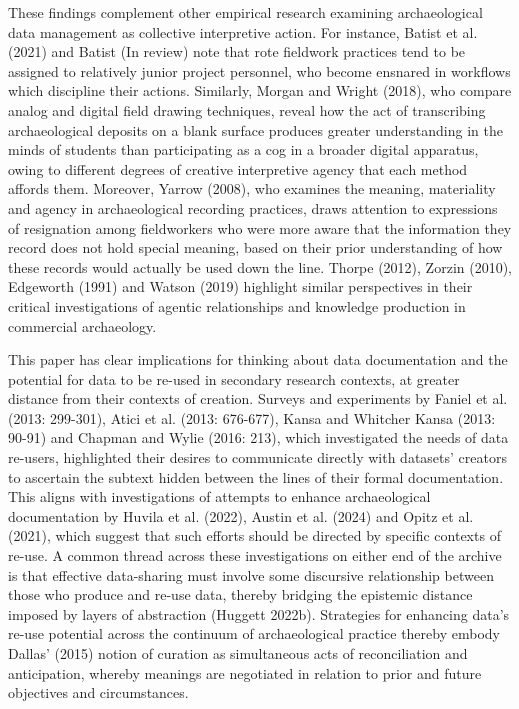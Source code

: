 \documentclass[
]{article}
\begin{document}
These findings complement other empirical research examining
archaeological data management as collective interpretive action. For
instance, Batist et al. (2021) and Batist (In review) note that rote
fieldwork practices tend to be assigned to relatively junior project
personnel, who become ensnared in workflows which discipline their
actions. Similarly, Morgan and Wright (2018), who compare analog and
digital field drawing techniques, reveal how the act of transcribing
archaeological deposits on a blank surface produces greater
understanding in the minds of students than participating as a cog in a
broader digital apparatus, owing to different degrees of creative
interpretive agency that each method affords them. Moreover, Yarrow
(2008), who examines the meaning, materiality and agency in
archaeological recording practices, draws attention to expressions of
resignation among fieldworkers who were more aware that the information
they record does not hold special meaning, based on their prior
understanding of how these records would actually be used down the line.
Thorpe (2012), Zorzin (2010), Edgeworth (1991) and Watson (2019)
highlight similar perspectives in their critical investigations of
agentic relationships and knowledge production in commercial
archaeology.

This paper has clear implications for thinking about data documentation
and the potential for data to be re-used in secondary research contexts,
at greater distance from their contexts of creation. Surveys and
experiments by Faniel et al. (2013: 299-301), Atici et al. (2013:
676-677), Kansa and Whitcher Kansa (2013: 90-91) and Chapman and Wylie
(2016: 213), which investigated the needs of data re-users, highlighted
their desires to communicate directly with datasets' creators to
ascertain the subtext hidden between the lines of their formal
documentation. This aligns with investigations of attempts to enhance
archaeological documentation by Huvila et al. (2022), Austin et al.
(2024) and Opitz et al. (2021), which suggest that such efforts should
be directed by specific contexts of re-use. A common thread across these
investigations on either end of the archive is that effective
data-sharing must involve some discursive relationship between those who
produce and re-use data, thereby bridging the epistemic distance imposed
by layers of abstraction (Huggett 2022b). Strategies for enhancing
data's re-use potential across the continuum of archaeological practice
thereby embody Dallas' (2015) notion of curation as simultaneous acts of
reconciliation and anticipation, whereby meanings are negotiated in
relation to prior and future objectives and circumstances.
\end{document}
